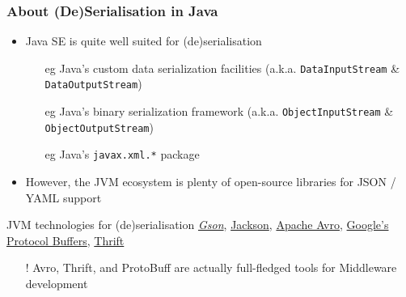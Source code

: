 \documentclass{beamer}\mode<presentation>{\usetheme{AMSBolognaFC}}
\begin{document}
\begin{frame}%
    \frametitle{About (De)Serialisation in Java}

    \begin{itemize}
        \item Java SE is quite well suited for (de)serialisation
        \begin{itemize}
            \item[eg] Java's custom data serialization facilities (a.k.a. \texttt{DataInputStream} \& \texttt{DataOutputStream})
            \item[eg] Java's binary serialization framework (a.k.a. \texttt{ObjectInputStream} \& \texttt{ObjectOutputStream})
            \item[eg] Java's \texttt{javax.xml.*} package
        \end{itemize}

        \vfill

        \item However, the JVM ecosystem is plenty of open-source libraries for JSON / YAML support

    \end{itemize}

    \vfill

    \begin{block}{JVM technologies for (de)serialisation}
        \href{https://github.com/google/gson}{\emph{Gson}},
        \href{https://github.com/FasterXML/jackson}{Jackson},
        \href{https://avro.apache.org/docs/1.10.0/}{Apache Avro},
        \href{https://developers.google.com/protocol-buffers}{Google's Protocol Buffers},
        \href{https://thrift.apache.org/}{Thrift}
    \end{block}
    \begin{itemize}\small
        \item[!] Avro, Thrift, and ProtoBuff are actually full-fledged tools for Middleware development
    \end{itemize}

\end{frame}
\end{document}
